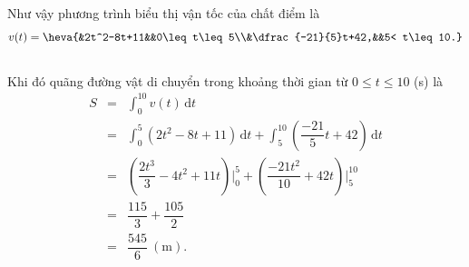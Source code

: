 \begin{bt}
{		Như vậy phương  trình biểu thị vận tốc của chất điểm là $$v(t)=\heva{&2t^2-8t+11&&0\leq t\leq 5\\&\dfrac{-21}{5}t+42,&&5< t\leq 10.}$$\\
		Khi đó  quãng đường vật di chuyển trong khoảng thời gian từ $0\leq t\leq 10$ (s) là
		\allowdisplaybreaks\begin{eqnarray*}
		S&=&\int_0^{10}v(t)\mathrm{\,d}t\\ 
		 &=&\int_0^5\left(2t^2-8t+11\right)\mathrm{\,d}t+\int_5^{10}\left(\dfrac{-21}{5}t+42\right)\mathrm{\,d}t\\
		 &=&\left(\dfrac{2t^3}{3}-4t^2+11t\right)\bigg|_0^5+\left(\dfrac{-21t^2}{10}+42t\right)\bigg|_5^{10}\\
		&=&\dfrac{115}{3}+\dfrac{105}{2}\\ 
		&=&\dfrac{545}{6}\  (\mathrm{m}).
	\end{eqnarray*}
} 
\end{bt}

